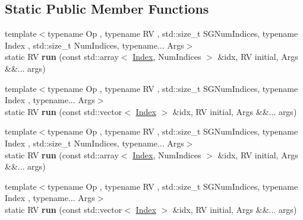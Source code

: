 \subsection*{Static Public Member Functions}
\begin{DoxyCompactItemize}
\item 
\mbox{\label{struct_eigen_1_1internal_1_1tensor__static__symgroup__do__apply_3_01internal_1_1type__list_3_01first_00_01next_8_8_8_01_4_01_4_a35ca67ba675c9c5325783bbb44a23fd8}} 
{\footnotesize template$<$typename Op , typename RV , std\+::size\+\_\+t S\+G\+Num\+Indices, typename Index , std\+::size\+\_\+t Num\+Indices, typename... Args$>$ }\\static RV {\bfseries run} (const std\+::array$<$ \hyperlink{namespace_eigen_a62e77e0933482dafde8fe197d9a2cfde}{Index}, Num\+Indices $>$ \&idx, RV initial, Args \&\&... args)
\item 
\mbox{\label{struct_eigen_1_1internal_1_1tensor__static__symgroup__do__apply_3_01internal_1_1type__list_3_01first_00_01next_8_8_8_01_4_01_4_a3c814e2e8862ec236c403d0266986444}} 
{\footnotesize template$<$typename Op , typename RV , std\+::size\+\_\+t S\+G\+Num\+Indices, typename Index , typename... Args$>$ }\\static RV {\bfseries run} (const std\+::vector$<$ \hyperlink{namespace_eigen_a62e77e0933482dafde8fe197d9a2cfde}{Index} $>$ \&idx, RV initial, Args \&\&... args)
\item 
\mbox{\label{struct_eigen_1_1internal_1_1tensor__static__symgroup__do__apply_3_01internal_1_1type__list_3_01first_00_01next_8_8_8_01_4_01_4_a35ca67ba675c9c5325783bbb44a23fd8}} 
{\footnotesize template$<$typename Op , typename RV , std\+::size\+\_\+t S\+G\+Num\+Indices, typename Index , std\+::size\+\_\+t Num\+Indices, typename... Args$>$ }\\static RV {\bfseries run} (const std\+::array$<$ \hyperlink{namespace_eigen_a62e77e0933482dafde8fe197d9a2cfde}{Index}, Num\+Indices $>$ \&idx, RV initial, Args \&\&... args)
\item 
\mbox{\label{struct_eigen_1_1internal_1_1tensor__static__symgroup__do__apply_3_01internal_1_1type__list_3_01first_00_01next_8_8_8_01_4_01_4_a3c814e2e8862ec236c403d0266986444}} 
{\footnotesize template$<$typename Op , typename RV , std\+::size\+\_\+t S\+G\+Num\+Indices, typename Index , typename... Args$>$ }\\static RV {\bfseries run} (const std\+::vector$<$ \hyperlink{namespace_eigen_a62e77e0933482dafde8fe197d9a2cfde}{Index} $>$ \&idx, RV initial, Args \&\&... args)
\end{DoxyCompactItemize}


